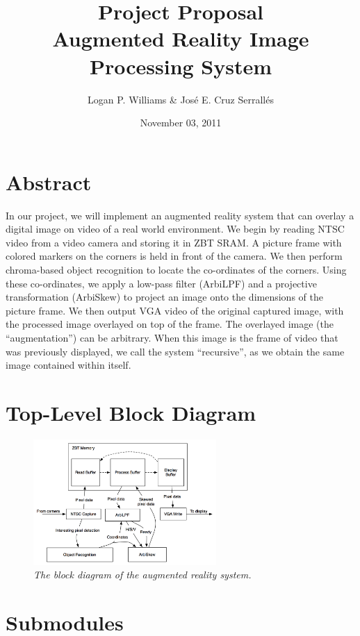 \documentclass[10pt]{article}
\begin{document}
\title{Project Proposal\\Augmented Reality Image Processing System}
\author{Logan P. Williams \& Jos\'{e} E. Cruz Serrall\'{e}s}
\date{November 03, 2011}
\maketitle

\section{Abstract}
In our project, we will implement an augmented reality system that can overlay a digital image on video of a real world environment. We begin by reading NTSC video from a video camera and storing it in ZBT SRAM. A picture frame with colored markers on the corners is held in front of the camera. We then perform chroma-based object recognition to locate the co-ordinates of the corners. Using these co-ordinates, we apply a low-pass filter (ArbiLPF) and a projective transformation (ArbiSkew) to project an image onto the dimensions of the picture frame. We then output VGA video of the original captured image, with the processed image overlayed on top of the frame. The overlayed image (the ``augmentation'') can be arbitrary. When this image is the frame of video that was previously displayed, we call the system ``recursive'', as we obtain the same image contained within itself.
\section{Top-Level Block Diagram}
\begin{figure}[h!]
\centering
\includegraphics[width=0.62\textwidth]{block_diagram.png}
\caption{\emph{The block diagram of the augmented reality system.}}
\end{figure}
\section{Submodules}
\end{document}
